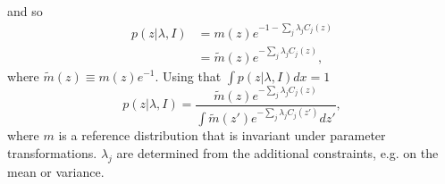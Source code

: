 	and so
	\begin{equation}
		\begin{split}
			p(z|\lambda, I)&=m(z)e^{-1-\sum_{j}\lambda_{j}C_j(z)}\\
			&=\tilde{m}(z)e^{-\sum_{j}\lambda_{j}C_j(z)},
		\end{split}
	\end{equation}
	where $\tilde{m}(z)\equiv m(z)e^{-1}$. Using that $\int p(z|\lambda, I) dx =1$
	\begin{equation}
		p(z|\lambda, I)=\frac{\tilde{m}(z)e^{-\sum_{j}\lambda_{j}C_j(z)}}{\int \tilde{m}(z')e^{-\sum_{j}\lambda_{j}C_j(z')}dz'},
	\end{equation}
	where $m$ is a reference distribution that is invariant under parameter transformations. $\lambda_j$ are determined from the additional constraints, e.g. on the mean or variance.
	
